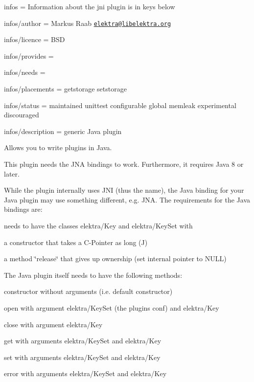 
\begin{DoxyItemize}
\item infos = Information about the jni plugin is in keys below
\item infos/author = Markus Raab \href{mailto:elektra@libelektra.org}{\tt elektra@libelektra.\+org}
\item infos/licence = B\+SD
\item infos/provides =
\item infos/needs =
\item infos/placements = getstorage setstorage
\item infos/status = maintained unittest configurable global memleak experimental discouraged
\item infos/description = generic Java plugin
\end{DoxyItemize}

Allows you to write plugins in Java.

This plugin needs the J\+NA bindings to work. Furthermore, it requires Java 8 or later.

While the plugin internally uses J\+NI (thus the name), the Java binding for your Java plugin may use something different, e.\+g. J\+NA. The requirements for the Java bindings are\+:


\begin{DoxyItemize}
\item needs to have the classes {\ttfamily elektra/\+Key} and {\ttfamily elektra/\+Key\+Set} with
\begin{DoxyItemize}
\item a constructor that takes a C-\/\+Pointer as long (J)
\item a method \char`\"{}release\char`\"{} that gives up ownership (set internal pointer to N\+U\+LL)
\end{DoxyItemize}
\end{DoxyItemize}

The Java plugin itself needs to have the following methods\+:


\begin{DoxyItemize}
\item constructor without arguments (i.\+e. default constructor)
\item open with argument {\ttfamily elektra/\+Key\+Set} (the plugin\textquotesingle{}s conf) and {\ttfamily elektra/\+Key}
\item close with argument {\ttfamily elektra/\+Key}
\item get with arguments {\ttfamily elektra/\+Key\+Set} and {\ttfamily elektra/\+Key}
\item set with arguments {\ttfamily elektra/\+Key\+Set} and {\ttfamily elektra/\+Key}
\item error with arguments {\ttfamily elektra/\+Key\+Set} and {\ttfamily elektra/\+Key}
\end{DoxyItemize}

